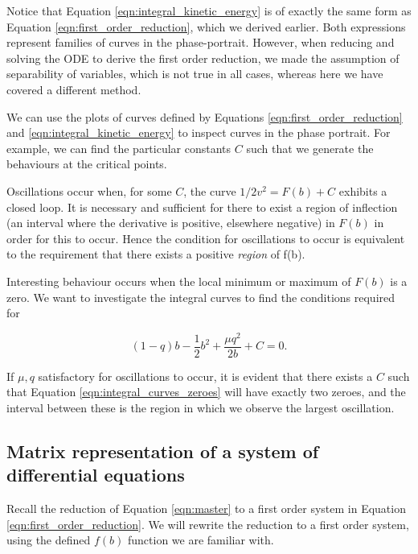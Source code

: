 \documentclass{article}
\begin{document}

Notice that Equation \ref{eqn:integral_kinetic_energy} is of exactly the same form as Equation \ref{eqn:first_order_reduction},
which we derived earlier.
Both expressions represent families of curves in the phase-portrait.
However, when reducing and solving the ODE to derive the first order reduction, we made the assumption of separability of variables,
which is not true in all cases,
whereas here we have covered a different method.

We can use the plots of curves defined by Equations \ref{eqn:first_order_reduction} and \ref{eqn:integral_kinetic_energy} to inspect curves in the phase portrait.
For example, we can find the particular constants $C$ such that we generate the behaviours at the critical points.


Oscillations occur when, for some $C$, the curve $1/2 v^2 = F(b) + C$ exhibits a closed loop.
It is necessary and sufficient for there to exist a region of inflection (an interval where the derivative is positive,
elsewhere negative) in $F(b)$ in order for this to occur.
Hence the condition for oscillations to occur is equivalent to the requirement that there exists a positive \textit{region} of f(b).

Interesting behaviour occurs when the local minimum or maximum of $F(b)$ is a zero. We want to investigate the integral curves to find the conditions required for

\begin{equation}
	(1-q)b - \frac{1}{2}b^2 + \frac{\mu q^2}{2b} + C = 0.
	\label{eqn:integral_curves_zeroes}
\end{equation}

If $\mu, q$ satisfactory for oscillations to occur,
it is evident that there exists a $C$ such that Equation \ref{eqn:integral_curves_zeroes} will have exactly two zeroes,
and the interval between these is the region in which we observe the largest oscillation.

\subsection{Matrix representation of a system of differential equations}

Recall the reduction of Equation \ref{eqn:master} to a first order system in Equation \ref{eqn:first_order_reduction}.
We will rewrite the reduction to a first order system, using the defined $f(b)$ function we are familiar with.
\end{document}
